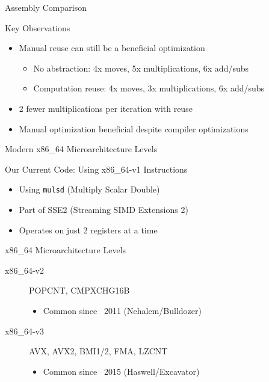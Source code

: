 \documentclass{beamer}
\begin{document}
\begin{frame}{Assembly Comparison}
    \begin{block}{Key Observations}
        \begin{itemize}
            \item Manual reuse can still be a beneficial optimization
            \begin{itemize}
                \item No abstraction: 4x moves, 5x multiplications, 6x add/subs
                \item Computation reuse: 4x moves, 3x multiplications, 6x add/subs
            \end{itemize}
            \item 2 fewer multiplications per iteration with reuse
            \item Manual optimization beneficial despite compiler optimizations
        \end{itemize}
    \end{block}
\end{frame}

\begin{frame}{Modern x86\_64 Microarchitecture Levels}
    \begin{block}{Our Current Code: Using x86\_64-v1 Instructions}
        \begin{itemize}
            \item Using \texttt{mulsd} (Multiply Scalar Double)
            \item Part of SSE2 (Streaming SIMD Extensions 2)
            \item Operates on just 2 registers at a time
        \end{itemize}
    \end{block}

    \begin{block}{x86\_64 Microarchitecture Levels}
        \begin{description}
            \item[x86\_64-v2] POPCNT, CMPXCHG16B
            \begin{itemize}
                \item Common since ~2011 (Nehalem/Bulldozer)
            \end{itemize}
            
            \item[x86\_64-v3] AVX, AVX2, BMI1/2, FMA, LZCNT
            \begin{itemize}
                \item Common since ~2015 (Haswell/Excavator)
            \end{itemize}
        \end{description}
    \end{block}
\end{frame}
\end{document}

